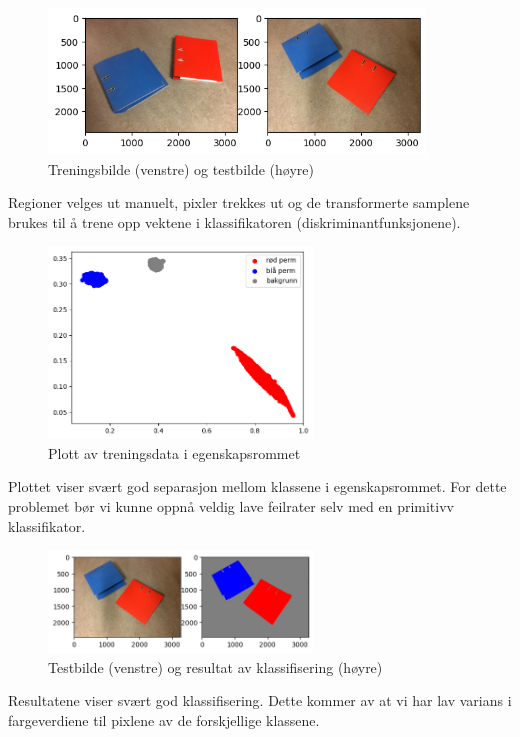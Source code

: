 \documentclass{article}
\begin{document}
\begin{figure}[h]
    \centering
    \includegraphics[width=10cm]{permer}
    \caption{Treningsbilde (venstre) og testbilde (høyre)}
\end{figure}

Regioner velges ut manuelt, pixler trekkes ut og de transformerte samplene brukes
til å trene opp vektene i klassifikatoren (diskriminantfunksjonene).
\newpage
\begin{figure}[h]
    \centering
    \includegraphics[width=7cm]{egenskap_perm}
    \caption{Plott av treningsdata i egenskapsrommet}
\end{figure}

Plottet viser svært god separasjon mellom klassene i egenskapsrommet. 
For dette problemet bør vi kunne oppnå veldig lave feilrater selv med en primitivv klassifikator.

\begin{figure}[h]
    \centering
    \includegraphics[width=7cm]{resultat_perm.png}
    \caption{Testbilde (venstre) og resultat av klassifisering (høyre)}
\end{figure}

Resultatene viser svært god klassifisering. Dette kommer av at vi har 
lav varians i fargeverdiene til pixlene av de forskjellige klassene.
\end{document}
